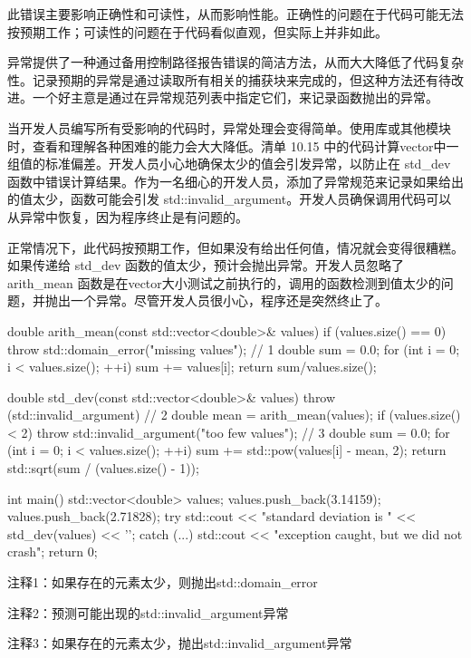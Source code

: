 此错误主要影响正确性和可读性，从而影响性能。正确性的问题在于代码可能无法按预期工作；可读性的问题在于代码看似直观，但实际上并非如此。

异常提供了一种通过备用控制路径报告错误的简洁方法，从而大大降低了代码复杂性。记录预期的异常是通过读取所有相关的捕获块来完成的，但这种方法还有待改进。一个好主意是通过在异常规范列表中指定它们，来记录函数抛出的异常。


当开发人员编写所有受影响的代码时，异常处理会变得简单。使用库或其他模块时，查看和理解各种困难的能力会大大降低。清单 10.15 中的代码计算vector中一组值的标准偏差。开发人员小心地确保太少的值会引发异常，以防止在 std\_dev 函数中错误计算结果。作为一名细心的开发人员，添加了异常规范来记录如果给出的值太少，函数可能会引发 std::invalid\_argument。开发人员确保调用代码可以从异常中恢复，因为程序终止是有问题的。

正常情况下，此代码按预期工作，但如果没有给出任何值，情况就会变得很糟糕。如果传递给 std\_dev 函数的值太少，预计会抛出异常。开发人员忽略了 arith\_mean 函数是在vector大小测试之前执行的，调用的函数检测到值太少的问题，并抛出一个异常。尽管开发人员很小心，程序还是突然终止了。


\begin{cpp}
double arith_mean(const std::vector<double>& values) {
  if (values.size() == 0)
    throw std::domain_error("missing values"); // 1
  double sum = 0.0;
  for (int i = 0; i < values.size(); ++i)
    sum += values[i];
  return sum/values.size();
}

double std_dev(const std::vector<double>& values)
                throw (std::invalid_argument) { // 2
  double mean = arith_mean(values);
  if (values.size() < 2)
    throw std::invalid_argument("too few values"); // 3
  double sum = 0.0;
  for (int i = 0; i < values.size(); ++i)
    sum += std::pow(values[i] - mean, 2);
  return std::sqrt(sum / (values.size() - 1));
}

int main() {
  std::vector<double> values;
  values.push_back(3.14159);
  values.push_back(2.71828);
  try {
    std::cout << "standard deviation is " << std_dev(values) << '\n';
  } catch (...) {
    std::cout << "exception caught, but we did not crash\n";
  }
  return 0;
}
\end{cpp}

{\footnotesize
注释1：如果存在的元素太少，则抛出std::domain\_error

注释2：预测可能出现的std::invalid\_argument异常

注释3：如果存在的元素太少，抛出std::invalid\_argument异常
}

